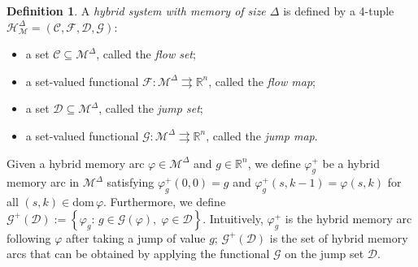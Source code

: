 \documentclass[journal,final,twocolumn]{IEEEtran}
\theoremstyle{definition}
\newtheorem{defn}{Definition}
\begin{document}
\begin{defn}
A \emph{hybrid system with memory of size $\Delta$} is defined by a 4-tuple ${\mathcal{H}_{\mathcal{M}}^{\Delta}}=({\mathcal{C}},{\mathcal{F}},{\mathcal{D}},{\mathcal{G}})$:
\begin{itemize}
\item a set ${\mathcal{C}}{\subseteq}{\mathcal{M}^{\Delta}}$, called the \emph{flow set};
\item a set-valued functional ${\mathcal{F}}:{\mathcal{M}^{\Delta}}{\rightrightarrows} {\mathbb R}^n$, called the \emph{flow map};
\item a set ${\mathcal{D}}{\subseteq}{\mathcal{M}^{\Delta}}$, called the \emph{jump set};
\item a set-valued functional ${\mathcal{G}}:{\mathcal{M}^{\Delta}}{\rightrightarrows} {\mathbb R}^n$, called the \emph{jump map}.
\end{itemize}
\end{defn}

Given a hybrid memory arc ${\varphi}\in{\mathcal{M}^{\Delta}}$ and $g\in{\mathbb R}^n$, we define ${\varphi}_g^+$ be a hybrid memory arc in ${\mathcal{M}^{\Delta}}$ satisfying ${\varphi}_g^+(0,0)  = g$ and ${\varphi}_g^+(s,k-1) = {\varphi}(s,k)$ for all $(s,k)\in{\text{dom}\,} {\varphi}$. Furthermore, we define ${\mathcal{G}}^+({\mathcal{D}}):={\left\{{{\varphi}_g:\,g\in{\mathcal{G}}({\varphi}),\;{\varphi}\in {\mathcal{D}}}\right\}}$. Intuitively, ${\varphi}_g^+$ is the hybrid memory arc following ${\varphi}$ after taking a jump of value $g$; ${\mathcal{G}}^+({\mathcal{D}})$ is the set of hybrid memory arcs that can be obtained by applying the functional ${\mathcal{G}}$ on the jump set ${\mathcal{D}}$.
\end{document}
